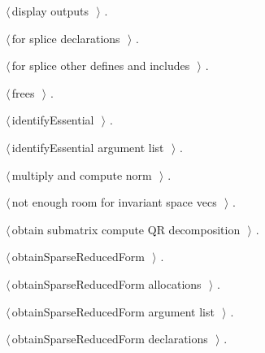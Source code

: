 \documentclass{article}
\begin{document}
{\begin{list}{}{\setlength{\itemsep}{-\parsep}\setlength{\itemindent}{-\leftmargin}}
{}
\item $\langle\,$display outputs\nobreak\ {\footnotesize {}}$\,\rangle$ {\footnotesize {\NWtxtRefIn} .
}
\item $\langle\,$for splice declarations\nobreak\ {\footnotesize {}}$\,\rangle$ {\footnotesize {\NWtxtRefIn} .}
\item $\langle\,$for splice other defines and includes\nobreak\ {\footnotesize {}}$\,\rangle$ {\footnotesize {\NWtxtRefIn} .}
\item $\langle\,$frees\nobreak\ {\footnotesize {}}$\,\rangle$ {\footnotesize {\NWtxtRefIn} .
}
\item $\langle\,$identifyEssential\nobreak\ {\footnotesize {}}$\,\rangle$ {\footnotesize {\NWtxtRefIn} .}
\item $\langle\,$identifyEssential argument list\nobreak\ {\footnotesize {}}$\,\rangle$ {\footnotesize {\NWtxtRefIn} .
}
\item $\langle\,$multiply and compute norm\nobreak\ {\footnotesize {}}$\,\rangle$ {\footnotesize {\NWtxtRefIn} .}
\item $\langle\,$not enough room for invariant space vecs\nobreak\ {\footnotesize {}}$\,\rangle$ {\footnotesize {\NWtxtRefIn} .}
\item $\langle\,$obtain submatrix compute QR decomposition\nobreak\ {\footnotesize {}}$\,\rangle$ {\footnotesize {\NWtxtRefIn} .}
\item $\langle\,$obtainSparseReducedForm\nobreak\ {\footnotesize {}}$\,\rangle$ {\footnotesize {\NWtxtRefIn} .}
\item $\langle\,$obtainSparseReducedForm allocations\nobreak\ {\footnotesize {}}$\,\rangle$ {\footnotesize {\NWtxtRefIn} .}
\item $\langle\,$obtainSparseReducedForm argument list\nobreak\ {\footnotesize {}}$\,\rangle$ {\footnotesize {\NWtxtRefIn} .
}
\item $\langle\,$obtainSparseReducedForm declarations\nobreak\ {\footnotesize {}}$\,\rangle$ {\footnotesize {\NWtxtRefIn} .}

\end{list}}
\end{document}
